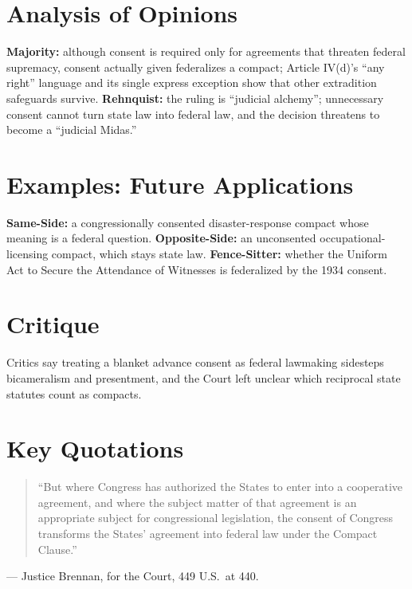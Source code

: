 \documentclass[12pt]{article}
\begin{document}
\section{Analysis of Opinions}
\textbf{Majority:} although consent is required only for agreements that threaten federal supremacy, consent actually given federalizes a compact; Article IV(d)'s ``any right'' language and its single express exception show that other extradition safeguards survive. \textbf{Rehnquist:} the ruling is ``judicial alchemy''; unnecessary consent cannot turn state law into federal law, and the decision threatens to become a ``judicial Midas.''

\section{Examples: Future Applications}
\textbf{Same-Side:} a congressionally consented disaster-response compact whose meaning is a federal question. \textbf{Opposite-Side:} an unconsented occupational-licensing compact, which stays state law. \textbf{Fence-Sitter:} whether the Uniform Act to Secure the Attendance of Witnesses is federalized by the 1934 consent.

\section{Critique}
Critics say treating a blanket advance consent as federal lawmaking sidesteps bicameralism and presentment, and the Court left unclear which reciprocal state statutes count as compacts.

\section{Key Quotations}
\begin{quote}
``But where Congress has authorized the States to enter into a cooperative agreement, and where the subject matter of that agreement is an appropriate subject for congressional legislation, the consent of Congress transforms the States' agreement into federal law under the Compact Clause.''
\end{quote}
\noindent --- Justice Brennan, for the Court, 449 U.S.\ at 440.
\end{document}
